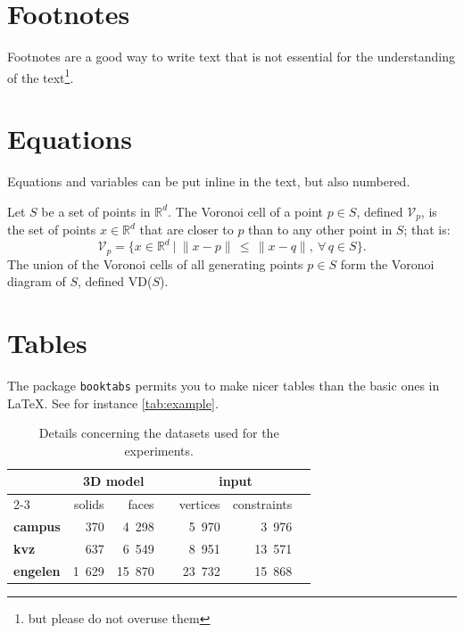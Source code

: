 %
\section{Footnotes}

Footnotes are a good way to write text that is not essential for the understanding of the text\footnote{but please do not overuse them}.

%
\section{Equations}

Equations and variables can be put inline in the text, but also numbered.

Let $S$ be a set of points in $\mathbb{R}^d$. 
The Voronoi cell of a point $p \in S$, defined $\mathcal{V}_{p}$, is the set of points $x \in \mathbb{R}^d$ that are closer to $p$ than to any other point in $S$; that is:
\begin{equation}
\mathcal{V}_p = \{x \in \mathbb{R}^{d} \ | \ \|x-p\| \, \leq \, \|x-q\|, \ \forall \, q \in S \}. 
\end{equation}
The union of the Voronoi cells of all generating points $p \in S$ form the Voronoi diagram of $S$, defined VD($S$).



%
\section{Tables}

The package \texttt{booktabs} permits you to make nicer tables than the basic ones in \LaTeX.
See for instance \autoref{tab:example}.
\begin{table}
  \centering
  \begin{tabular}{@{}lrrcrrc@{}} \toprule
    & \multicolumn{2}{c}{3D model} && \multicolumn{2}{c}{input} \\
    \cmidrule{2-3}  \cmidrule{5-6} 
    & solids & faces && vertices & constraints  \\ 
    \toprule
    \textbf{campus}  & 370   & 4~298  && 5~970  & 3~976   \\
    \textbf{kvz}     & 637   & 6~549  && 8~951  & 13~571  \\
    \textbf{engelen} & 1~629 & 15~870 && 23~732 & 15~868 \\ 
    \bottomrule
   \end{tabular}
  \caption{Details concerning the datasets used for the experiments.}%
\label{tab:example}
\end{table}


